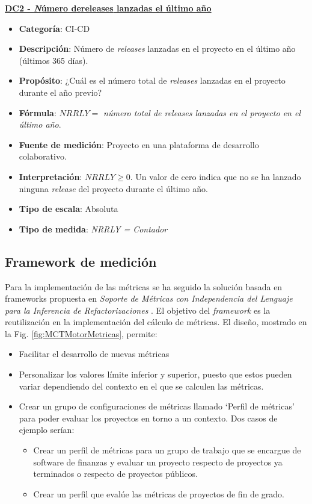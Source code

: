 \textbf{\underline{DC2 - \textit Número de{releases} lanzadas el último año}}
\begin{itemize}
	\item \textbf{Categoría}: CI-CD
	\item \textbf{Descripción}: Número de \textit{releases} lanzadas en el proyecto en el último año (últimos 365 días).
	\item \textbf{Propósito}: ¿Cuál es el número total de \textit{releases} lanzadas en el proyecto durante el año previo?
	\item \textbf{Fórmula}: $NRRLY =$ \textit{número total de releases lanzadas en el proyecto en el último año}.
	\item \textbf{Fuente de medición}: Proyecto en una plataforma de desarrollo colaborativo.
	\item \textbf{Interpretación}: $NRRLY \geq 0$. Un valor de cero indica que no se ha lanzado ninguna \textit{release} del proyecto durante el último año.
	\item \textbf{Tipo de escala}: Absoluta
	\item \textbf{Tipo de medida}: \textit{NRRLY = Contador}
\end{itemize}



\subsection{Framework de medición}\label{sect:3_3_3_FrameworkMedicion}

Para la implementación de las métricas se ha seguido la solución basada en frameworks propuesta en \textit{Soporte de Métricas con Independencia del Lenguaje para la Inferencia de Refactorizaciones} \cite{marticorena_sanchez_soporte_2005}. El objetivo del \textit{framework} es la reutilización en la implementación del cálculo de métricas. El diseño, mostrado en la Fig. \ref{fig:MCTMotorMetricas}, permite:

\begin{itemize}
	\tightlist
	\item Facilitar el desarrollo de nuevas métricas
	\item Personalizar los valores límite inferior y superior, puesto que estos pueden variar dependiendo del contexto en el que se calculen las métricas.
	\item Crear un grupo de configuraciones de métricas llamado `Perfil de métricas' para poder evaluar los proyectos en torno a un contexto. Dos casos de ejemplo serían:
	\begin{itemize}
		\tightlist
		\item Crear un perfil de métricas para un grupo de trabajo que se encargue de software de finanzas y evaluar un proyecto respecto de proyectos ya terminados o respecto de proyectos públicos.
		\item Crear un perfil que evalúe las métricas de proyectos de fin de grado.
	\end{itemize}
\end{itemize}

